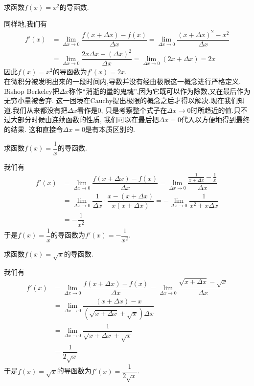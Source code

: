 \documentclass{ctexart}
\begin{document}
\begin{problem}[P.0A.3]
    求函数$f(x)=x^2$的导函数.
\end{problem}
\begin{derivation}
    同样地,我们有
    \[\begin{aligned}
        f'(x)
        &= \lim_{\Delta x\to0}\dfrac{f(x+\Delta x)-f(x)}{\Delta x}=\lim_{\Delta x\to0}\dfrac{(x+\Delta x)^2-x^2}{\Delta x} \\
        &= \lim_{\Delta x\to0}\dfrac{2x\Delta x-(\Delta x)^2}{\Delta x}=\lim_{\Delta x\to0}(2x+\Delta x)=2x
    \end{aligned}\]
    因此$f(x)=x^2$的导函数为$f'(x)=2x$.\\
    在微积分被发明出来的一段时间内,导数并没有经由极限这一概念进行严格定义.%
    Bishop Berkeley把$\Delta x$称作“消逝的量的鬼魂”,因为它既可以作为除数,又在最后作为无穷小量被舍弃.%
    这一困境在Cauchy提出极限的概念之后才得以解决.现在我们知道,我们从来都没有把$\Delta x$看作是$0$,%
    只是考察整个式子在$\Delta x\to0$时所趋近的值.只不过大部分时候由连续函数的性质,%
    我们可以在最后把$\Delta x=0$代入以方便地得到最终的结果.%
    这和直接令$\Delta x=0$是有本质区别的.
\end{derivation}
\begin{problem}[P.0A.4]
    求函数$f(x)=\dfrac1x$的导函数.
\end{problem}
\begin{derivation}
    我们有
    \[\begin{aligned}
        f'(x)
        &= \lim_{\Delta x\to0}\dfrac{f(x+\Delta x)-f(x)}{\Delta x}=\lim_{\Delta x\to0}\dfrac{\frac{1}{x+\Delta x}-\frac1x}{\Delta x} \\
        &= \lim_{\Delta x\to0}\dfrac{1}{\Delta x}\cdot\dfrac{x-(x+\Delta x)}{x(x+\Delta x)}=-\lim_{\Delta x\to0}\dfrac{1}{x^2+x\Delta x} \\
        &= -\dfrac1{x^2}
    \end{aligned}\]
    于是$f(x)=\dfrac1x$的导函数为$f'(x)=-\dfrac{1}{x^2}$.
\end{derivation}
\begin{problem}[P.0A.5]
    求函数$f(x)=\sqrt{x}$的导函数.
\end{problem}
\begin{derivation}
    我们有
    \[\begin{aligned}
        f'(x)
        &= \lim_{\Delta x\to0}\dfrac{f(x+\Delta x)-f(x)}{\Delta x}=\lim_{\Delta x\to0}\dfrac{\sqrt{x+\Delta x}-\sqrt{x}}{\Delta x} \\
        &= \lim_{\Delta x\to0}\dfrac{(x+\Delta x)-x}{\left(\sqrt{x+\Delta x}+\sqrt{x}\right)\Delta x} \\
        &= \lim_{\Delta x\to0}\dfrac{1}{\sqrt{x+\Delta x}+\sqrt{x}} \\
        &= \dfrac{1}{2\sqrt{x}}
    \end{aligned}\]
    于是$f(x)=\sqrt{x}$的导函数为$f'(x)=\dfrac{1}{2\sqrt{x}}$.
\end{derivation}
\end{document}
